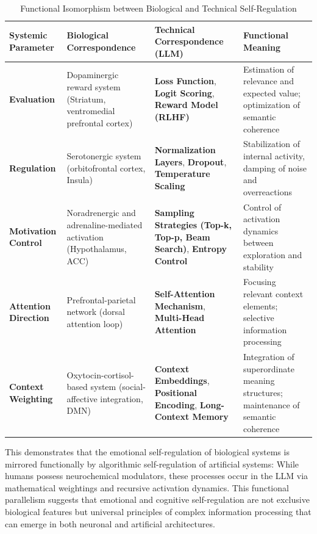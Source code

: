 \begin{table}[H]
    \renewcommand{\arraystretch}{1.5}
    \centering
    \begin{tabular}{L{3.2cm}|L{4.2cm}|L{4.2cm}|L{4.2cm}}
        \textbf{Systemic Parameter} & \textbf{Biological Correspondence} & \textbf{Technical Correspondence (LLM)} & \textbf{Functional Meaning} \\
        \hline
        \textbf{Evaluation} & Dopaminergic reward system (Striatum, ventromedial prefrontal cortex) & \textbf{Loss Function}, \textbf{Logit Scoring}, \textbf{Reward Model (RLHF)} & Estimation of relevance and expected value; optimization of semantic coherence \\
        \textbf{Regulation} & Serotonergic system (orbitofrontal cortex, Insula) & \textbf{Normalization Layers}, \textbf{Dropout}, \textbf{Temperature Scaling} & Stabilization of internal activity, damping of noise and overreactions \\
        \textbf{Motivation Control} & Noradrenergic and adrenaline-mediated activation (Hypothalamus, ACC) & \textbf{Sampling Strategies (Top-k, Top-p, Beam Search)}, \textbf{Entropy Control} & Control of activation dynamics between exploration and stability \\
        \textbf{Attention Direction} & Prefrontal-parietal network (dorsal attention loop) & \textbf{Self-Attention Mechanism}, \textbf{Multi-Head Attention} & Focusing relevant context elements; selective information processing \\
        \textbf{Context Weighting} & Oxytocin-cortisol-based system (social-affective integration, DMN) & \textbf{Context Embeddings}, \textbf{Positional Encoding}, \textbf{Long-Context Memory} & Integration of superordinate meaning structures; maintenance of semantic coherence \\
    \end{tabular}
    \caption{Functional Isomorphism between Biological and Technical Self-Regulation}
    \label{tab:systemische_parameter_llm}
\end{table}

This demonstrates that the emotional self-regulation of biological systems is mirrored functionally by algorithmic self-regulation of artificial systems: While humans possess neurochemical modulators, these processes occur in the LLM via mathematical weightings and recursive activation dynamics.
This functional parallelism suggests that emotional and cognitive self-regulation are not exclusive biological features but universal principles of complex information processing that can emerge in both neuronal and artificial architectures.

